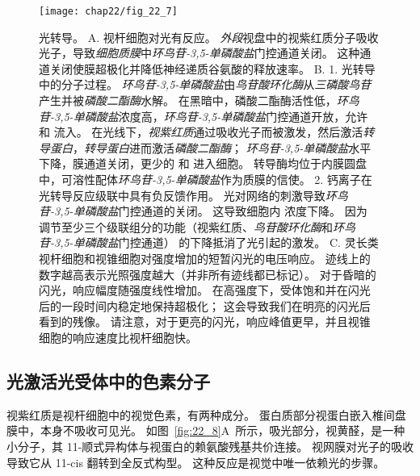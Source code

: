 \begin{figure}[htbp]
	\centering
	\texttt{[image: chap22/fig\_22\_7]}
	\caption{光转导。
		A. 视杆细胞对光有反应。
		\textit{外段}视盘中的视紫红质分子吸收光子，导致\textit{细胞质膜}中\textit{环鸟苷-3,5-单磷酸盐}门控通道关闭。
		这种通道关闭使膜超极化并降低神经递质谷氨酸的释放速率\cite{alberts2017molecular}。
		B. 1. 光转导中的分子过程。
		\textit{环鸟苷-3,5-单磷酸盐}由\textit{鸟苷酸环化酶}从\textit{三磷酸鸟苷}产生并被\textit{磷酸二酯酶}水解。
		在黑暗中，磷酸二酯酶活性低，\textit{环鸟苷-3,5-单磷酸盐}浓度高，\textit{环鸟苷-3,5-单磷酸盐}门控通道开放，允许  和  流入。
		在光线下，\textit{视紫红质}通过吸收光子而被激发，然后激活\textit{转导蛋白}，\textit{转导蛋白}进而激活\textit{磷酸二酯酶}；
		\textit{环鸟苷-3,5-单磷酸盐}水平下降，膜通道关闭，更少的  和  进入细胞。
		转导酶均位于内膜圆盘中，可溶性配体\textit{环鸟苷-3,5-单磷酸盐}作为质膜的信使。 
		2. 钙离子在光转导反应级联中具有负反馈作用。
		光对网络的刺激导致\textit{环鸟苷-3,5-单磷酸盐}门控通道的关闭。
		这导致细胞内  浓度下降。
		因为  调节至少三个级联组分的功能（视紫红质、\textit{鸟苷酸环化酶}和\textit{环鸟苷-3,5-单磷酸盐}门控通道） 的下降抵消了光引起的激发。 
		C. 灵长类视杆细胞和视锥细胞对强度增加的短暂闪光的电压响应。
		迹线上的数字越高表示光照强度越大（并非所有迹线都已标记）。 
		对于昏暗的闪光，响应幅度随强度线性增加。 
		在高强度下，受体饱和并在闪光后的一段时间内稳定地保持超极化；
		这会导致我们在明亮的闪光后看到的残像。 
		请注意，对于更亮的闪光，响应峰值更早，并且视锥细胞的响应速度比视杆细胞快\cite{schneeweis1995photovoltage}。}
	\label{fig:22_7}
\end{figure}



\subsection{光激活光受体中的色素分子}

视紫红质是视杆细胞中的视觉色素，有两种成分。
蛋白质部分视蛋白嵌入椎间盘膜中，本身不吸收可见光。 
如图~\ref{fig:22_8}A~所示，吸光部分，视黄醛，是一种小分子，其 11-顺式异构体与视蛋白的赖氨酸残基共价连接。
视网膜对光子的吸收导致它从 11-cis 翻转到全反式构型。
这种反应是视觉中唯一依赖光的步骤。


